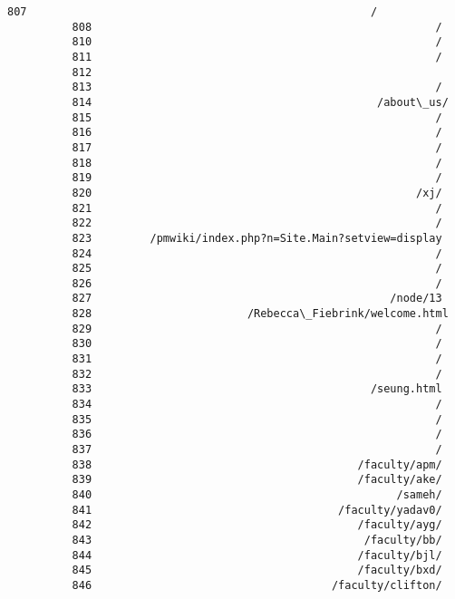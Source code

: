 \documentclass[11pt]{article}
\begin{document}
\begin{Verbatim}[commandchars=\\\{\}]
          807                                                     /
          808                                                     /
          810                                                     /
          811                                                     /
          812                                                      
          813                                                     /
          814                                            /about\_us/
          815                                                     /
          816                                                     /
          817                                                     /
          818                                                     /
          819                                                     /
          820                                                  /xj/
          821                                                     /
          822                                                     /
          823         /pmwiki/index.php?n=Site.Main?setview=display
          824                                                     /
          825                                                     /
          826                                                     /
          827                                              /node/13
          828                        /Rebecca\_Fiebrink/welcome.html
          829                                                     /
          830                                                     /
          831                                                     /
          832                                                     /
          833                                           /seung.html
          834                                                     /
          835                                                     /
          836                                                     /
          837                                                     /
          838                                         /faculty/apm/
          839                                         /faculty/ake/
          840                                               /sameh/
          841                                      /faculty/yadav0/
          842                                         /faculty/ayg/
          843                                          /faculty/bb/
          844                                         /faculty/bjl/
          845                                         /faculty/bxd/
          846                                     /faculty/clifton/

\end{Verbatim}
\end{document}
